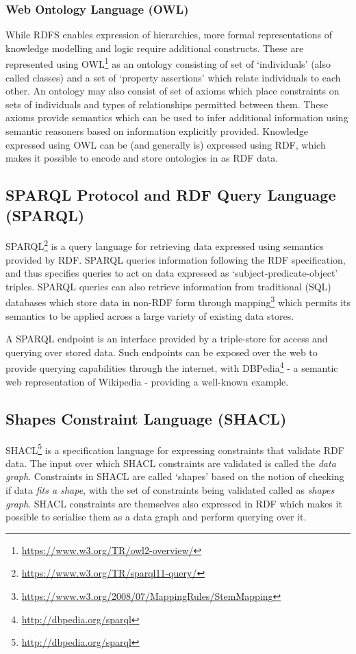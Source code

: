 \subsubsection{Web Ontology Language (OWL)}
While RDFS enables expression of hierarchies, more formal representations of knowledge modelling and logic require additional constructs. These are represented using OWL\footnote{\url{https://www.w3.org/TR/owl2-overview/}} as an ontology consisting of set of `individuals' (also called classes) and a set of `property assertions' which relate individuals to each other.
An ontology may also consist of set of axioms which place constraints on sets of individuals and types of relationships permitted between them. These axioms provide semantics which can be used to infer additional information using semantic reasoners based on information explicitly provided.
Knowledge expressed using OWL can be (and generally is) expressed using RDF, which makes it possible to encode and store ontologies in as RDF data.

\subsection{SPARQL Protocol and RDF Query Language (SPARQL)}
SPARQL\footnote{\url{https://www.w3.org/TR/sparql11-query/}} is a query language for retrieving data expressed using semantics provided by RDF.
SPARQL queries information following the RDF specification, and thus specifies queries to act on data expressed as `subject-predicate-object' triples.
SPARQL queries can also retrieve information from traditional (SQL) databases which store data in non-RDF form through mapping\footnote{\url{https://www.w3.org/2008/07/MappingRules/StemMapping}} which permits its semantics to be applied across a large variety of existing data stores.

A SPARQL endpoint is an interface provided by a triple-store for access and querying over stored data. Such endpoints can be exposed over the web to provide querying capabilities through the internet, with DBPedia\footnote{\url{http://dbpedia.org/sparql}} - a semantic web representation of Wikipedia - providing a well-known example.

\subsection{Shapes Constraint Language (SHACL)}
SHACL\footnote{\url{http://dbpedia.org/sparql}} is a specification language for expressing constraints that validate RDF data. The input over which SHACL constraints are validated is called the \textit{data graph}.
Constraints in SHACL are called `shapes' based on the notion of checking if data \textit{fits a shape}, with the set of constraints being validated called as \textit{shapes graph}.
SHACL constraints are themselves also expressed in RDF which makes it possible to serialise them as a data graph and perform querying over it.

